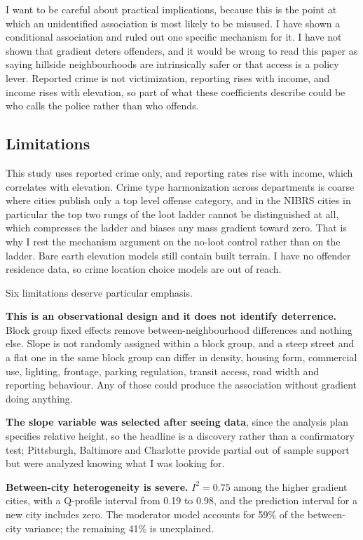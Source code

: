 \documentclass[12pt,letterpaper]{article}
\begin{document}
I want to be careful about practical implications, because this is the point at which
an unidentified association is most likely to be misused. I have shown a conditional
association and ruled out one specific mechanism for it. I have not shown that
gradient deters offenders, and it would be wrong to read this paper as saying hillside
neighbourhoods are intrinsically safer or that access is a policy lever. Reported
crime is not victimization, reporting rises with income, and income rises with
elevation, so part of what these coefficients describe could be who calls the police
rather than who offends.

\subsection{Limitations}

This study uses reported crime only, and reporting rates rise with income, which
correlates with elevation. Crime type harmonization across departments is coarse where
cities publish only a top level offense category, and in the NIBRS cities in
particular the top two rungs of the loot ladder cannot be distinguished at all, which
compresses the ladder and biases any mass gradient toward zero. That is why I rest the
mechanism argument on the no-loot control rather than on the ladder. Bare earth
elevation models still contain built terrain. I have no offender residence data, so
crime location choice models are out of reach.

Six limitations deserve particular emphasis.

\textbf{This is an observational design and it does not identify deterrence.} Block
group fixed effects remove between-neighbourhood differences and nothing else. Slope
is not randomly assigned within a block group, and a steep street and a flat one in
the same block group can differ in density, housing form, commercial use, lighting,
frontage, parking regulation, transit access, road width and reporting behaviour. Any
of those could produce the association without gradient doing anything.

\textbf{The slope variable was selected after seeing data}, since the analysis plan
specifies relative height, so the headline is a discovery rather than a confirmatory
test; Pittsburgh, Baltimore and Charlotte provide partial out of sample support but
were analyzed knowing what I was looking for.

\textbf{Between-city heterogeneity is severe.} $I^2 = 0.75$ among the higher gradient
cities, with a Q-profile interval from 0.19 to 0.98, and the prediction interval for
a new city includes zero. The moderator model accounts for 59\% of the between-city
variance; the remaining 41\% is unexplained.
\end{document}
